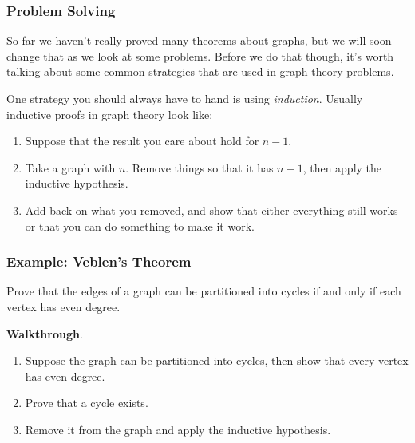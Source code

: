 \documentclass[11pt, mathserif]{beamer}
\theoremstyle{definition}
\theoremstyle{remark}
\begin{document}
\begin{frame}
  \frametitle{Problem Solving}



So far we haven't really proved many theorems about graphs, but we will soon change that as we look at some problems. Before we do that though, it's worth talking about some common strategies that are used in graph theory problems.

\pause

\vspace{2\baselineskip}
One strategy you should always have to hand is using \emph{induction}. \pause 
Usually inductive proofs in graph theory look like: 

\begin{enumerate}
  \item Suppose that the result you care about hold for $n - 1$.
  \item Take a graph with $n$. Remove things so that it has $n - 1$, then apply the inductive hypothesis.
  \item Add back on what you removed, and show that either everything still works or that you can do something to make it work.
\end{enumerate}

\end{frame}

\begin{frame}
  \frametitle{Example: Veblen's Theorem}

  \begin{example}
    Prove that the edges of a graph can be partitioned into cycles if and only if each vertex has even degree.
\end{example}

\vspace{2\baselineskip}
\pause
\textbf{Walkthrough}.
\begin{enumerate}[<+->]
    \item Suppose the graph can be partitioned into cycles, then show that every vertex has even degree.
    \item Prove that a cycle exists.
    \item Remove it from the graph and apply the inductive hypothesis.
\end{enumerate}

\end{frame}
\end{document}

